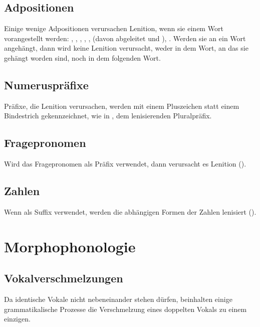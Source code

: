 \subsection{Adpositionen} Einige wenige Adpositionen verursachen Lenition, wenn
sie einem Wort vorangestellt werden: , , , , ,
 (davon abgeleitet  und ), . Werden sie an ein
Wort angeh\"angt, dann wird keine Lenition verursacht, weder in dem Wort, an das
sie geh\"angt worden sind, noch in dem folgenden Wort.

\subsection{Numeruspr\"afixe} Pr\"afixe, die Lenition verursachen, werden mit
einem Pluszeichen statt einem Bindestrich gekennzeichnet, wie in , dem
lenisierenden Pluralpr\"afix.

\subsection{Fragepronomen} Wird das Fragepronomen  als Pr\"afix verwendet,
dann verursacht es Lenition ().

\subsection{Zahlen} Wenn als Suffix verwendet, werden die abh\"angigen Formen
der Zahlen lenisiert (). 


\section{Morphophonologie}

\subsection{Vokalverschmelzungen} Da identische Vokale nicht nebeneinander
stehen d\"urfen, beinhalten einige grammatikalische Prozesse die Verschmelzung
eines doppelten Vokals zu einem einzigen.\label{l-and-s:contract}

